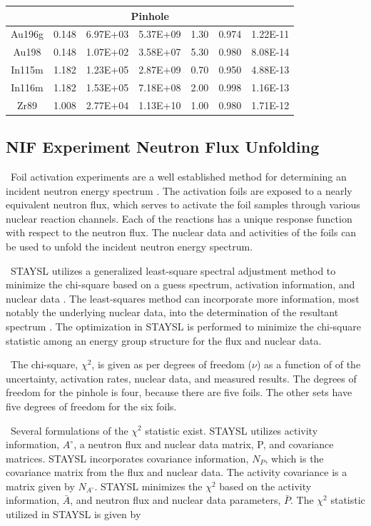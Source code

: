\documentclass[journal]{IEEEtran}
\begin{document}
\begin{table}[]
{\begin{tabular}{|c|c|c|c|c|c|c|}
			\multicolumn{7}{|c|}{Pinhole} \\ \hline
			Au196g & 0.148 & 6.97E+03 & 5.37E+09 & 1.30 & 0.974 & 1.22E-11 \\ \hline
			Au198 & 0.148 & 1.07E+02 & 3.58E+07 & 5.30 & 0.980 & 8.08E-14 \\ \hline
			In115m & 1.182 & 1.23E+05 & 2.87E+09 & 0.70 & 0.950 & 4.88E-13 \\ \hline
			In116m & 1.182 & 1.53E+05 & 7.18E+08 & 2.00 & 0.998 & 1.16E-13 \\ \hline
			Zr89 & 1.008 & 2.77E+04 & 1.13E+10 & 1.00 & 0.980 & 1.71E-12 \\ \hline
		\end{tabular}
	}
	
\end{table}

\subsection{NIF Experiment Neutron Flux Unfolding}

\ Foil activation experiments are a well established method for determining an incident neutron energy spectrum \cite{Knoll,Reginatto2010,Vagena2018b}. The activation foils are exposed to a nearly equivalent neutron flux, which serves to activate the foil samples through various nuclear reaction channels. Each of the reactions has a unique response function with respect to the neutron flux. The nuclear data and activities of the foils can be used to unfold the incident neutron energy spectrum.

\ STAYSL utilizes a generalized least-square spectral adjustment method to minimize the chi-square based on a guess spectrum, activation information, and nuclear data \cite{Perey1977}. The least-squares method can incorporate more information, most notably the underlying nuclear data, into the determination of the resultant spectrum \cite{Perey1977}. The optimization in STAYSL is performed to minimize the chi-square statistic among an energy group structure for the flux and nuclear data. 

\ The chi-square, $\chi^{2}$, is given as per degrees of freedom ($\nu$) as a function of of the uncertainty, activation rates, nuclear data, and measured results. The degrees of freedom for the pinhole is four, because there are five foils. The other sets have five degrees of freedom for the six foils. 

\ Several formulations of the $\chi^{2}$ statistic exist. STAYSL utilizes activity information, $A^{\circ}$, a neutron flux and nuclear data matrix, P, and covariance matrices. STAYSL incorporates covariance information, $N_{P}$, which is the covariance matrix from the flux and nuclear data. The activity covariance is a matrix given by $N_{A^{\circ}}$. STAYSL minimizes the $\chi^{2}$ based on the activity information, $\bar{A}$, and neutron flux and nuclear data parameters, $\bar{P}$. The $\chi^{2}$ statistic utilized in STAYSL is given by \cite{Perey1977}
	
\end{document}
